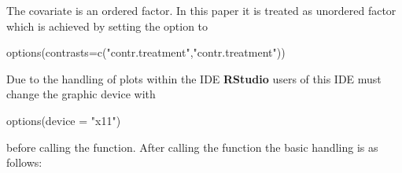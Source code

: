 \documentclass[nojss]{jss}
\begin{document}
The covariate  is an ordered factor. In this paper it is treated as unordered factor which is achieved by setting the option  to
%
\begin{Schunk}
\begin{Sinput}
 options(contrasts=c("contr.treatment","contr.treatment"))
\end{Sinput}
\end{Schunk}
%

Due to the handling of plots within the IDE \textbf{RStudio} users of this IDE must change the graphic device with
%
\begin{Schunk}
\begin{Sinput}
 options(device = "x11")
\end{Sinput}
\end{Schunk}
%
before calling the function. After calling the function the basic handling is as follows:
\end{document}
